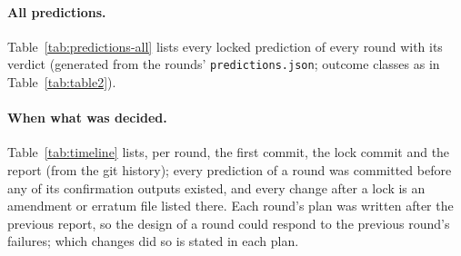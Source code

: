\begin{itemize}
\end{itemize}

\begin{table}[H]
\centering\small

\caption{Locked predictions per round by outcome (generated by \texttt{paper/scripts/predictions\_table.py}). \emph{Decided}: one of
the named competing hypotheses won by the locked rule (whether it was the expected one is recorded per claim in \texttt{claims.yaml}).
\emph{Demoted}: made exploratory before the lock by a discriminability pre-check. Rows count every locked entry, including per-backbone
sub-predictions and summary verdicts of the same question, so the counts are not counts of independent hypotheses. Every entry is listed in
Table~\ref{tab:predictions-all}.}
\label{tab:table2}
\end{table}

\paragraph{All predictions.}
Table~\ref{tab:predictions-all} lists every locked prediction of every round with its verdict (generated from the rounds'
\texttt{predictions.json}; outcome classes as in Table~\ref{tab:table2}).
\begin{small}\end{small}

\paragraph{When what was decided.}
Table~\ref{tab:timeline} lists, per round, the first commit, the lock commit and the report (from the git history); every prediction of a
round was committed before any of its confirmation outputs existed, and every change after a lock is an amendment or erratum file listed
there. Each round's plan was written after the previous report, so the design of a round could respond to the previous round's failures;
which changes did so is stated in each plan.
\begin{table}[H]\centering\tiny

\caption{Timeline of the preregistered rounds (generated by \texttt{paper/scripts/timeline\_table.py} from the git history).}\label{tab:timeline}
\end{table}
